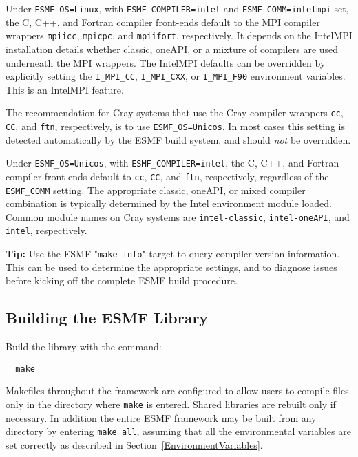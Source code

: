Under {\tt ESMF\_OS=Linux}, with {\tt ESMF\_COMPILER=intel} and {\tt ESMF\_COMM=intelmpi} set, the C, C++, and
Fortran compiler front-ends default to the MPI compiler wrappers {\tt mpiicc}, {\tt mpicpc}, and {\tt mpiifort},
respectively. It depends on the IntelMPI installation details whether classic, oneAPI, or a mixture of compilers
are used underneath the MPI wrappers. The IntelMPI defaults can be overridden by explicitly setting the
{\tt I\_MPI\_CC}, {\tt I\_MPI\_CXX}, or {\tt I\_MPI\_F90} environment variables. This is an IntelMPI feature.

The recommendation for Cray systems that use the Cray compiler wrappers {\tt cc}, {\tt CC}, and {\tt ftn},
respectively, is to use {\tt ESMF\_OS=Unicos}. In most cases this setting is detected automatically by the ESMF
build system, and should {\em not} be overridden.

Under {\tt ESMF\_OS=Unicos}, with {\tt ESMF\_COMPILER=intel}, the C, C++, and Fortran compiler front-ends default to
{\tt cc}, {\tt CC}, and {\tt ftn}, respectively, regardless of the  {\tt ESMF\_COMM} setting. The appropriate
classic, oneAPI, or mixed compiler combination is typically determined by the Intel environment module loaded.
Common module names on Cray systems are {\tt intel-classic}, {\tt intel-oneAPI}, and {\tt intel}, respectively.

{\bf Tip: } Use the ESMF "{\tt make info}" target to query compiler version information. This can be used to determine the
appropriate settings, and to diagnose issues before kicking off the complete ESMF build procedure.

\subsection{Building the ESMF Library}
\label{BuildESMF}



Build the library with the command:
\begin{verbatim}
  make
\end{verbatim}


Makefiles throughout the framework are configured to allow users to
compile files only in the directory where {\tt make} is entered. Shared
libraries are rebuilt only if necessary. In addition the entire ESMF
framework may be built from any directory by entering {\tt make all},
assuming that all the environmental variables are set correctly as
described in Section~\ref{EnvironmentVariables}.

